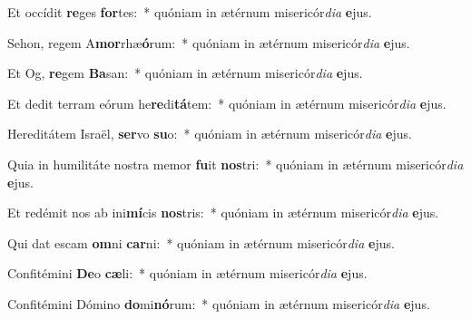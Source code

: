 \item Et occídit \textbf{re}ges \textbf{for}tes:~* quóniam in ætérnum misericór\textit{di}\textit{a} \textbf{e}jus.
\item Sehon, regem A\textbf{mor}rhæ\textbf{ó}rum:~* quóniam in ætérnum misericór\textit{di}\textit{a} \textbf{e}jus.
\item Et Og, \textbf{re}gem \textbf{Ba}san:~* quóniam in ætérnum misericór\textit{di}\textit{a} \textbf{e}jus.
\item Et dedit terram eórum he\textbf{re}di\textbf{tá}tem:~* quóniam in ætérnum misericór\textit{di}\textit{a} \textbf{e}jus.
\item Hereditátem Israël, \textbf{ser}vo \textbf{su}o:~* quóniam in ætérnum misericór\textit{di}\textit{a} \textbf{e}jus.
\item Quia in humilitáte nostra memor \textbf{fu}it \textbf{nos}tri:~* quóniam in ætérnum misericór\textit{di}\textit{a} \textbf{e}jus.
\item Et redémit nos ab ini\textbf{mí}cis \textbf{nos}tris:~* quóniam in ætérnum misericór\textit{di}\textit{a} \textbf{e}jus.
\item Qui dat escam \textbf{om}ni \textbf{car}ni:~* quóniam in ætérnum misericór\textit{di}\textit{a} \textbf{e}jus.
\item Confitémini \textbf{De}o \textbf{cæ}li:~* quóniam in ætérnum misericór\textit{di}\textit{a} \textbf{e}jus.
\item Confitémini Dómino \textbf{do}mi\textbf{nó}rum:~* quóniam in ætérnum misericór\textit{di}\textit{a} \textbf{e}jus.
